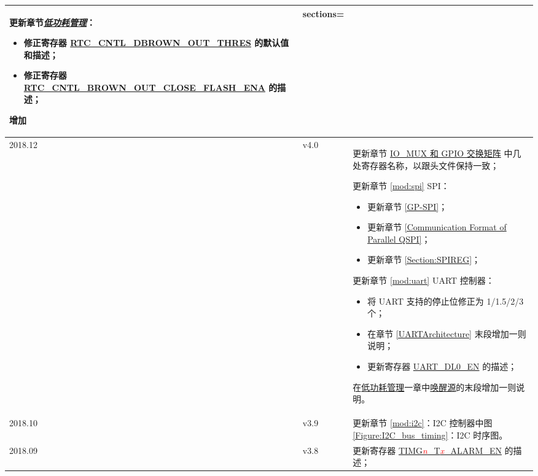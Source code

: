 \begin{longtable}[l]{ | m{2cm} | m{1.5cm} | m{12cm} | }
更新章节\hyperref[mod:lowpowm]{\it{低功耗管理}}：
\begin{itemize}
\item 修正寄存器 \hyperref[RTCCNTLDBROWNOUTTHRES]{RTC\_CNTL\_DBROWN\_OUT\_THRES} 的默认值和描述；
\item 修正寄存器 \hyperref[RTCCNTLBROWNOUTCLOSEFLASHENA]{RTC\_CNTL\_BROWN\_OUT\_CLOSE\_FLASH\_ENA} 的描述；
\end{itemize}

增加\href{https://www.espressif.com/zh-hans/company/contact/documentation_feedback?docId=3641&sections=}{文档反馈链接}。
\\\hline

2018.12&v4.0&更新章节 \hyperref[mod:iomuxgpio]{IO\_MUX 和 GPIO 交换矩阵} 中几处寄存器名称，以跟头文件保持一致；

更新章节 \ref{mod:spi} SPI：
\begin{itemize}
    \item 更新章节 \ref{GP-SPI}；
    \item 更新章节 \ref{Communication Format of Parallel QSPI}；
    \item 更新章节 \ref{Section:SPIREG}；
\end{itemize}

更新章节 \ref{mod:uart} UART 控制器：
\begin{itemize}
    \item 将 UART 支持的停止位修正为 1/1.5/2/3 个；
    \item 在章节 \ref{UARTArchitecture} 末段增加一则说明；
    \item 更新寄存器 \hyperref[UARTDL0EN]{UART\_DL0\_EN} 的描述；
\end{itemize}
在\hyperref[mod:lowpowm]{低功耗管理}一章中\hyperref[WakeupSource]{唤醒源}的末段增加一则说明。\\\hline
2018.10&v3.9& 更新章节 \ref{mod:i2c}：I2C 控制器中图 \ref{Figure:I2C_bus_timing}：I2C 时序图。\\\hline
2018.09&v3.8&更新寄存器 \hyperref[TIMGnTxALARMEN]{TIMG\textcolor{red}{\it{n}}\_T\textcolor{red}{\it{x}}\_ALARM\_EN} 的描述；


\end{longtable}
